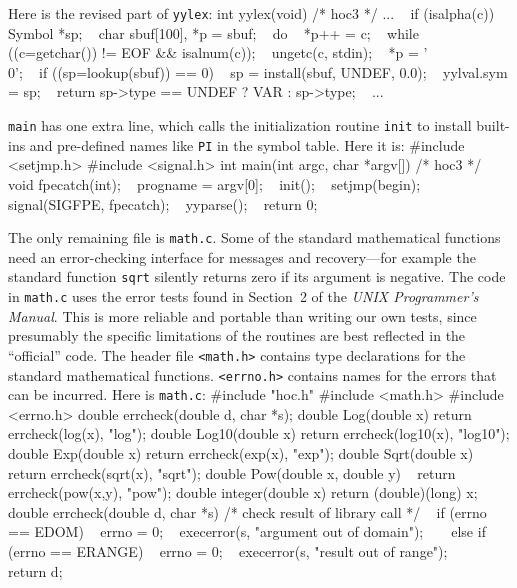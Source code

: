 {Here is the revised part of {\tt yylex}:
\begincode
int yylex(void)  /* hoc3 */
...
~       if (isalpha(c)) {
~               Symbol *sp;
~               char sbuf[100], *p = sbuf;
~               do {
~                       *p++ = c;
~               } while ((c=getchar()) != EOF && isalnum(c));
~               ungetc(c, stdin);
~               *p = '\\0';
~               if ((sp=lookup(sbuf)) == 0)
~                       sp = install(sbuf, UNDEF, 0.0);
~               yylval.sym = sp;
~               return sp->type == UNDEF ? VAR : sp->type;
~       }
...
\endcode
{}

{\tt main} has one extra line, which calls the initialization
routine {\tt init} to install built-ins and pre-defined names
like {\tt PI} in the symbol table. Here it is:
\begincode
#include <setjmp.h>
#include <signal.h>
\medbreak
int main(int argc, char *argv[])  /* hoc3 */
{
~       void fpecatch(int);
\smallskip
~       progname = argv[0];
~       init();
~       setjmp(begin);
~       signal(SIGFPE, fpecatch);
~       yyparse();
~       return 0;
}
\endcode

The only remaining file is {\tt math.c}. Some of the standard
mathematical functions need an error-checking interface for
messages and recovery---for example the standard function
{\tt sqrt} silently returns zero if its argument is negative.
The code in {\tt math.c} uses the error tests found in Section~2
of the {\sl UNIX Programmer's Manual}. This is more reliable
and portable than writing our own tests, since presumably the
specific limitations of the routines are best reflected in the
``official'' code. The header file {\tt<math.h>} contains type
declarations for the standard mathematical functions.
{\tt<errno.h>} contains names for the errors that can be incurred.
Here is {\tt math.c}:
\begincode
#include "hoc.h"
#include <math.h>
#include <errno.h>
\medbreak
double errcheck(double d, char *s);
\medbreak
double Log(double x)   { return errcheck(log(x),   "log");   }
double Log10(double x) { return errcheck(log10(x), "log10"); }
double Exp(double x)   { return errcheck(exp(x),   "exp");   }
double Sqrt(double x)  { return errcheck(sqrt(x),  "sqrt");  }
double Pow(double x, double y) {
~                        return errcheck(pow(x,y), "pow");   }
\smallbreak
double integer(double x) { return (double)(long) x; }
\medbreak
double errcheck(double d, char *s)
{ /* check result of library call */
~       if (errno == EDOM) {
~               errno = 0;
~               execerror(s, "argument out of domain");
~       }
\goodbreak
~       else if (errno == ERANGE) {
~               errno = 0;
~               execerror(s, "result out of range");
~       }
~       return d;
}
\endcode

}
